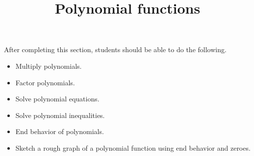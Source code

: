 \documentclass{ximera}
\title{Polynomial functions}
\begin{document}
\begin{abstract} 
\end{abstract}

\maketitle

\begin{sectionOutcomes}
After completing this section, students should be able to do the following.

\begin{itemize}
	\item Multiply polynomials.
	\item Factor polynomials.
	\item Solve polynomial equations.
	\item Solve polynomial inequalities.
	\item End behavior of polynomials.
	\item Sketch a rough graph of a polynomial function using end behavior and zeroes.
\end{itemize}
\end{sectionOutcomes}
\end{document}
